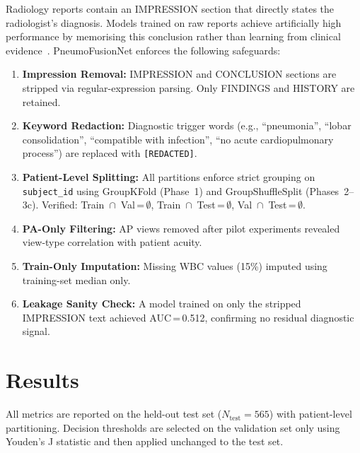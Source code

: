 \documentclass[conference]{IEEEtran}
\begin{document}
Radiology reports contain an IMPRESSION section that directly states the radiologist's diagnosis. Models trained on raw reports achieve artificially high performance by memorising this conclusion rather than learning from clinical evidence~\cite{bannur2023knowledge}. PneumoFusionNet enforces the following safeguards:
\begin{enumerate}[noitemsep, leftmargin=*]
  \item \textbf{Impression Removal:} IMPRESSION and CONCLUSION sections are stripped via regular-expression parsing. Only FINDINGS and HISTORY are retained.
  \item \textbf{Keyword Redaction:} Diagnostic trigger words (e.g., ``pneumonia'', ``lobar consolidation'', ``compatible with infection'', ``no acute cardiopulmonary process'') are replaced with \texttt{[REDACTED]}.
  \item \textbf{Patient-Level Splitting:} All partitions enforce strict grouping on \texttt{subject\_id} using GroupKFold (Phase~1) and GroupShuffleSplit (Phases~2--3c). Verified: Train~$\cap$~Val\,=\,$\emptyset$, Train~$\cap$~Test\,=\,$\emptyset$, Val~$\cap$~Test\,=\,$\emptyset$.
  \item \textbf{PA-Only Filtering:} AP views removed after pilot experiments revealed view-type correlation with patient acuity.
  \item \textbf{Train-Only Imputation:} Missing WBC values (15\%) imputed using training-set median only.
  \item \textbf{Leakage Sanity Check:} A model trained on only the stripped IMPRESSION text achieved AUC\,=\,0.512, confirming no residual diagnostic signal.
\end{enumerate}

\section{\textcolor{aideep}{Results}}

All metrics are reported on the held-out test set ($N_{\text{test}}\!=\!565$) with patient-level partitioning. Decision thresholds are selected on the validation set only using Youden's J statistic and then applied unchanged to the test set.
\end{document}
